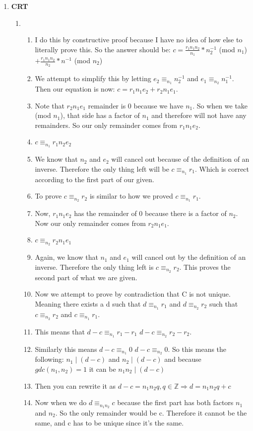 \documentclass[12pt,fleqn]{article}
\begin{document}
\begin{enumerate}
  
  \newpage
  \item \textbf{CRT}
  \begin{enumerate}
    \item 
    \begin{enumerate}
    		\item I do this by constructive proof because I have no idea of how else to literally prove this. So the answer should be: $c = \frac{r_1n_1n_2}{n_1} * n_2^{-1}$ (mod $n_1$) $+ \frac{r_1n_1n_2}{n_2} * n^{-1}$ (mod $n_2$)
    		\item We attempt to simplify this by letting $e_2 \equiv_{n_1} n_2^{-1}$ and $e_1 \equiv_{n_2} n_1^{-1}$. Then our equation is now: $c = r_1n_1e_2 + r_2n_1e_1$. 
    		\item Note that $r_2n_1e_1$ remainder is 0 because we have $n_1$. So when we take (mod $n_1$), that side has a factor of $n_1$ and therefore will not have any remainders. So our only remainder comes from $r_1n_1e_2$.
		\item $c \equiv_{n_1} r_1n_2e_2$
		\item We know that $n_2$ and $e_2$ will cancel out because of the definition of an inverse. Therefore the only thing left will be $c \equiv_{n_1} r_1$. Which is correct according to the first part of our given.
		\item To prove $c \equiv_{n_2} r_2$ is similar to how we proved $c \equiv_{n_1} r_1$. 
		\item Now, $r_1n_1e_2$ has the remainder of 0 because there is a factor of $n_2$. Now our only remainder comes from $r_2n_1e_1$. 
		\item $c \equiv_{n_2} r_2n_1e_1$
		\item Again, we know that $n_1$ and $e_1$ will cancel out by the definition of an inverse. Therefore the only thing left is $c \equiv_{n_2} r_2$. This proves the second part of what we are given. 
		\item Now we attempt to prove by contradiction that C is not unique. Meaning there exists a d such that $d \equiv_{n_1}r_1$ and $d \equiv_{n_2}r_2$ such that $c \equiv_{n_2} r_2$ and $c \equiv_{n_1} r_1$.
		\item This means that $d - c \equiv_{n_1} r_1 - r_1$  $d - c \equiv_{n_2} r_2 - r_2$. 
		\item Similarly this means  $d - c \equiv_{n_1} 0$  $d - c \equiv_{n_2} 0$. So this means the following: $n_1 \mid (d - c)$ and $n_2 \mid (d - c)$ and because $gdc(n_1, n_2) = 1$ it can be $n_1n_2 \mid (d - c)$
		\item Then you can rewrite it as $d - c = n_1n_2q, q \in \mathbb{Z} \Rightarrow d = n_1n_2q + c$
		\item Now when we do $d \equiv_{n_1n_2} c$ because the first part has both factors $n_1$ and $n_2$. So the only remainder would be c. Therefore it cannot be the same, and c has to be unique since it's the same.
    \end{enumerate}
	

\end{enumerate}
\end{enumerate}
\end{document}
